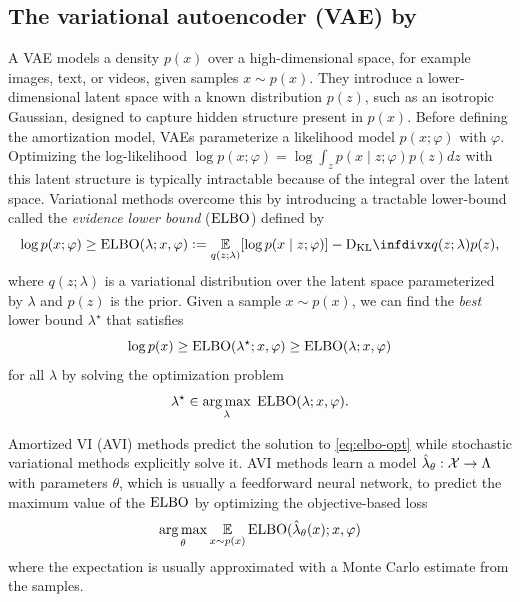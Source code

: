 \documentclass[twoside,11pt]{article}
\begin{document}
\subsection{The variational autoencoder (VAE) by \citet{kingma2013auto}}
A VAE models a density $p(x)$ over a high-dimensional space,
for example images, text, or videos, given samples $x\sim p(x)$.
They introduce a lower-dimensional latent space
with a known distribution $p(z)$, such as an isotropic Gaussian,
designed to capture hidden structure present
in $p(x)$.
Before defining the amortization model,
VAEs parameterize a likelihood model $p(x; \varphi)$ with $\varphi$.
Optimizing the log-likelihood
$\log p(x; \varphi)=\log\int_z p(x\mid z; \varphi)p(z)dz$
with this latent structure is typically intractable because
of the integral over the latent space.
Variational methods overcome this by introducing
a tractable lower-bound called the
\emph{evidence lower bound} ($\operatorname{ELBO}$) defined by
\begin{equation}
  \log p(x; \varphi)\geq \ELBO(\lambda; x, \varphi) \defeq \E_{q(z; \lambda)}[\log p(x\mid z; \varphi)] - \kl{q(z;\lambda)}{p(z)},
  \label{eq:elbo}
\end{equation}
where $q(z; \lambda)$ is a variational distribution
over the latent space parameterized by $\lambda$
and $p(z)$ is the prior.
Given a sample $x\sim p(x)$, we can find the \emph{best}
lower bound $\lambda^\star$ that satisfies
\begin{equation}
  \log p(x)\geq \operatorname{ELBO}(\lambda^\star; x, \varphi) \geq \operatorname{ELBO}(\lambda; x, \varphi)
  \label{eq:best-elbo}
\end{equation}
for all $\lambda$ by solving the optimization problem
\begin{equation}
  \lambda^\star \in \operatorname*{arg\,max}_\lambda\; \operatorname{ELBO}(\lambda; x, \varphi).
  \label{eq:elbo-opt}
\end{equation}

Amortized VI (AVI) methods predict the solution to
\cref{eq:elbo-opt} while stochastic variational
methods \citep{hoffman2013stochastic} explicitly solve it.
AVI methods learn a model $\hat \lambda_\theta: {\mathcal{X}}\rightarrow \Lambda$
with parameters $\theta$, which is usually a feedforward neural network,
to predict the maximum value of the $\operatorname{ELBO}$ by optimizing
the objective-based loss
\begin{equation}
  \operatorname*{arg\,max}_\theta \operatorname*{\mathbb{E}}_{x\sim p(x)} \operatorname{ELBO}(\hat \lambda_\theta(x); x, \varphi)
  \label{eq:vae-amor}
\end{equation}
where the expectation is usually approximated with a
Monte Carlo estimate from the samples.
\end{document}

